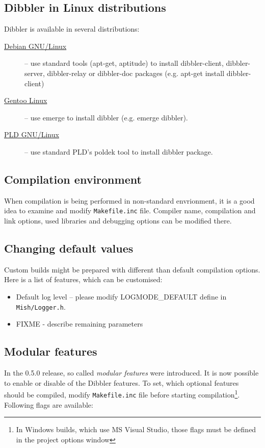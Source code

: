 \subsection{Dibbler in Linux distributions}
Dibbler is available in several distributions:

\begin{description}
 \item[\href{http://debian.org}{Debian GNU/Linux}] -- use standard tools
 (apt-get, aptitude) to install dibbler-client, dibbler-server,
 dibbler-relay or dibbler-doc packages (e.g. apt-get install dibbler-client)
 \item[\href{http://www.gentoo.org}{Gentoo Linux}] -- use emerge to
 install dibbler (e.g. emerge dibbler).
 \item[\href{http://www.pld-linux.org}{PLD GNU/Linux}] -- use standard
  PLD's poldek tool to install dibbler package.
\end{description}

\subsection{Compilation environment}
When compilation is being performed in non-standard envrionment, it is a
good idea to examine and modify \verb+Makefile.inc+ file. Compiler name,
compilation and link options, used libraries and debugging options can
be modified there.

\subsection{Changing default values}
Custom builds might be prepared with different than default
compilation options. Here is a list of features, which can be
customised:
\begin{itemize}
\item Default log level -- please modify LOGMODE\_DEFAULT define in
  \verb+Mish/Logger.h+.
\item FIXME - describe remaining parameters
\end{itemize}

\subsection{Modular features}
\label{modular-features}
In the 0.5.0 release, so called \emph{modular features} were
introduced. It is now possible to enable or disable of the Dibbler
features. To set, which optional features should be compiled, modify
\verb+Makefile.inc+ file before starting compilation\footnote{In Windows
builds, which use MS Visual Studio, those flags must be defined in the
project options window}. Following flags are available:

